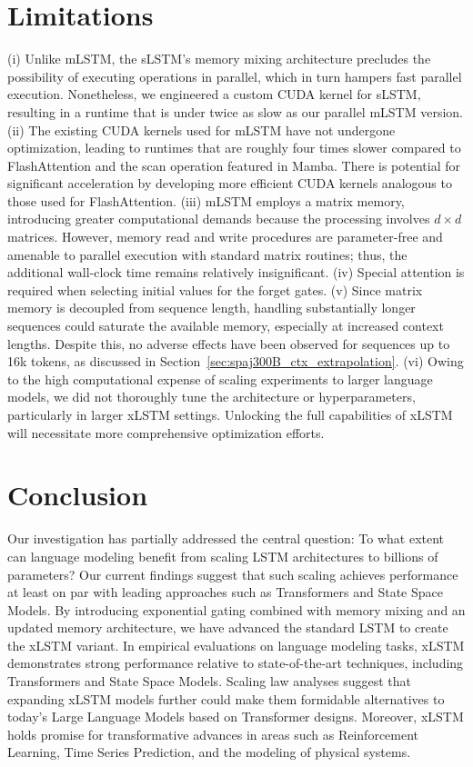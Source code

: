 \section{Limitations}

(i) Unlike mLSTM, the sLSTM's memory mixing architecture precludes the possibility of executing operations in parallel, which in turn hampers fast parallel execution. Nonetheless, we engineered a custom CUDA kernel for sLSTM, resulting in a runtime that is under twice as slow as our parallel mLSTM version. (ii) The existing CUDA kernels used for mLSTM have not undergone optimization, leading to runtimes that are roughly four times slower compared to FlashAttention and the scan operation featured in Mamba. There is potential for significant acceleration by developing more efficient CUDA kernels analogous to those used for FlashAttention. (iii) mLSTM employs a matrix memory, introducing greater computational demands because the processing involves $d \times d$ matrices. However, memory read and write procedures are parameter-free and amenable to parallel execution with standard matrix routines; thus, the additional wall-clock time remains relatively insignificant. (iv) Special attention is required when selecting initial values for the forget gates. (v) Since matrix memory is decoupled from sequence length, handling substantially longer sequences could saturate the available memory, especially at increased context lengths. Despite this, no adverse effects have been observed for sequences up to 16k tokens, as discussed in Section~\ref{sec:spaj300B_ctx_extrapolation}. (vi) Owing to the high computational expense of scaling experiments to larger language models, we did not thoroughly tune the architecture or hyperparameters, particularly in larger xLSTM settings. Unlocking the full capabilities of xLSTM will necessitate more comprehensive optimization efforts.

\section{Conclusion}
Our investigation has partially addressed the central question: To what extent can language modeling benefit from scaling LSTM architectures to billions of parameters? Our current findings suggest that such scaling achieves performance at least on par with leading approaches such as Transformers and State Space Models. By introducing exponential gating combined with memory mixing and an updated memory architecture, we have advanced the standard LSTM to create the xLSTM variant. In empirical evaluations on language modeling tasks, xLSTM demonstrates strong performance relative to state-of-the-art techniques, including Transformers and State Space Models. Scaling law analyses suggest that expanding xLSTM models further could make them formidable alternatives to today's Large Language Models based on Transformer designs. Moreover, xLSTM holds promise for transformative advances in areas such as Reinforcement Learning, Time Series Prediction, and the modeling of physical systems.

